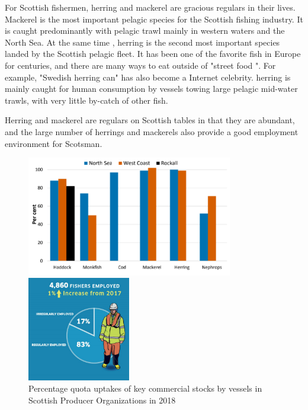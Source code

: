 \documentclass{mcmthesis}
\begin{document}
For Scottish fishermen, herring and mackerel are gracious regulars in their lives. Mackerel is the most important pelagic species for the Scottish fishing industry. It is caught predominantly with pelagic trawl mainly in western waters and the North Sea.
At the same time , herring is the second most important species landed by the Scottish pelagic fleet. It has been one of the favorite fish in Europe for centuries, and there are many ways to eat outside of "street food ". For example, "Swedish herring can" has also become a Internet celebrity. herring is mainly caught for human consumption by vessels towing large pelagic mid-water trawls, with very little by-catch of other fish. 

Herring and mackerel are regulars on Scottish tables in that they are abundant, and the large number of herrings and mackerels also provide a good employment environment for Scotsman.

			\begin{figure}[htbp]
				\centering
				\begin{minipage}[c]{0.5\textwidth}
					\centering
					\includegraphics[width=9cm]{./picture/figure5.png}
				\end{minipage}%
				\begin{minipage}[c]{0.5\textwidth}
					\centering
					\includegraphics[width=4.5cm]{./picture/figure6.png}
				\end{minipage}
				\caption{Percentage quota uptakes of key commercial stocks by vessels in Scottish Producer Organizations in 2018}
			\end{figure}
			
\end{document}
